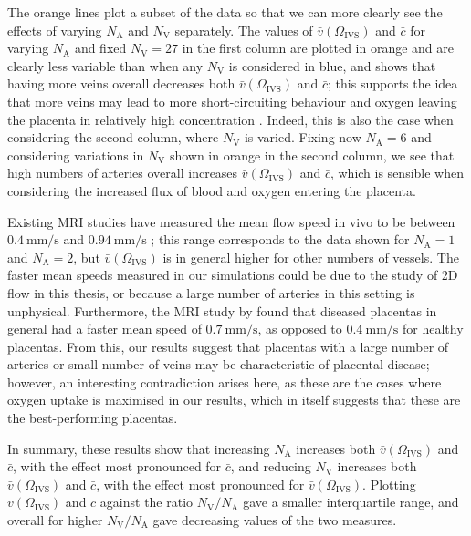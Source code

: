             The orange lines plot a subset of the data so that we can more clearly see the effects of varying $N_\text{A}$ and $N_\text{V}$ separately. The values of $\bar{v}(\Omega_\text{IVS})$ and $\bar{c}$ for varying $N_\text{A}$ and fixed $N_\text{V} = 27$ in the first column are plotted in orange and are clearly less variable than when any $N_\text{V}$ is considered in blue, and shows that having more veins overall decreases both $\bar{v}(\Omega_\text{IVS})$ and $\bar{c}$; this supports the idea that more veins may lead to more short-circuiting behaviour and oxygen leaving the placenta in relatively high concentration \cite{erianMaternalPlacentalBlood1977,chernyavskyMathematicalModelIntervillous2010}. Indeed, this is also the case when considering the second column, where $N_\text{V}$ is varied. Fixing now $N_\text{A} = 6$ and considering variations in $N_\text{V}$ shown in orange in the second column, we see that high numbers of arteries overall increases $\bar{v}(\Omega_\text{IVS})$ and $\bar{c}$, which is sensible when considering the increased flux of blood and oxygen entering the placenta.

            Existing MRI studies have measured the mean flow speed in vivo to be between $\qty{0.4}{\milli\metre\per\second}$ and $\qty{0.94}{\milli\metre\per\second}$ \cite{lecarpentierComputationalFluidDynamic2016,dellschaftHaemodynamicsHumanPlacenta2020,serovOptimalVilliDensity2015}; this range corresponds to the data shown for $N_\text{A} = 1$ and $N_\text{A} = 2$, but $\bar{v}(\Omega_\text{IVS})$ is in general higher for other numbers of vessels. The faster mean speeds measured in our simulations could be due to the study of 2D flow in this thesis, or because a large number of arteries in this setting is unphysical. Furthermore, the MRI study by \citeauthor{dellschaftHaemodynamicsHumanPlacenta2020} \cite{dellschaftHaemodynamicsHumanPlacenta2020} found that diseased placentas in general had a faster mean speed of $\qty{0.7}{\milli\metre\per\second}$, as opposed to $\qty{0.4}{\milli\metre\per\second}$ for healthy placentas. From this, our results suggest that placentas with a large number of arteries or small number of veins may be characteristic of placental disease; however, an interesting contradiction arises here, as these are the cases where oxygen uptake is maximised in our results, which in itself suggests that these are the best-performing placentas.

            In summary, these results show that increasing $N_\text{A}$ increases both $\bar{v}(\Omega_\text{IVS})$ and $\bar{c}$, with the effect most pronounced for $\bar{c}$, and reducing $N_\text{V}$ increases both $\bar{v}(\Omega_\text{IVS})$ and $\bar{c}$, with the effect most pronounced for $\bar{v}(\Omega_\text{IVS})$. Plotting $\bar{v}(\Omega_\text{IVS})$ and $\bar{c}$ against the ratio $N_\text{V}/N_\text{A}$ gave a smaller interquartile range, and overall for higher $N_\text{V}/N_\text{A}$ gave decreasing values of the two measures.

